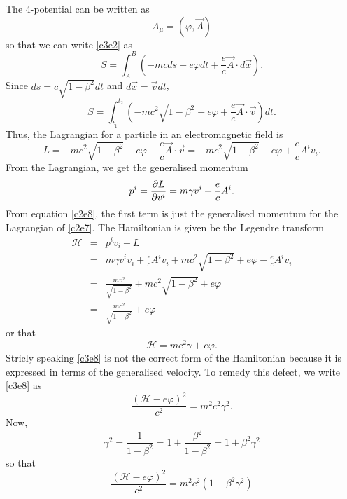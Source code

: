 \begin{enumerate}
The 4-potential can be written as 
\begin{equation}\label{c3e3}
A_\mu = (\varphi, \vec{A})
\end{equation}
so that we can write \eqref{c3e2} as
\begin{equation}\label{c3e4}
S = \int_A^B\left(-mcds - e\varphi dt + 
\frac{e}{c}\vec{A}\cdot d\vec{x}\right).
\end{equation}
Since $ds = c\sqrt{1 - \beta^2}dt$ and $d\vec{x} = \vec{v}dt$,
\begin{equation}\label{c3e5}
S = \int_{t_1}^{t_2}\left(-mc^2\sqrt{1 - \beta^2} - e\varphi + 
\frac{e}{c}\vec{A}\cdot\vec{v}\right)dt.
\end{equation}
Thus, the Lagrangian for a particle in an electromagnetic field is
\begin{equation}\label{c3e6}
L = -mc^2\sqrt{1 - \beta^2} - e\varphi + \frac{e}{c}\vec{A}\cdot\vec{v}
= -mc^2\sqrt{1 - \beta^2} - e\varphi + \frac{e}{c}A^i v_i.
\end{equation}
From the Lagrangian, we get the generalised momentum
\begin{equation}\label{c3e7}
p^i = \frac{\partial{L}}{\partial{v^i}} = m\gamma v^i + \frac{e}{c}A^i.
\end{equation}
From equation \eqref{c2e8}, the first term is just the generalised momentum for
the Lagrangian of \eqref{c2e7}. The Hamiltonian is given be the Legendre
transform
\begin{eqnarray*}
\mathcal{H} &=& p^iv_i - L \\
  &=& m\gamma v^iv_i + \frac{e}{c}A^iv_i + mc^2\sqrt{1 - \beta^2} + e\varphi - 
  \frac{e}{c}A^iv_i \\
  &=& \frac{mv^2}{\sqrt{1 - \beta^2}} + mc^2\sqrt{1 - \beta^2} + e\varphi \\
  &=& \frac{mc^2}{\sqrt{1 - \beta^2}} + e\varphi
\end{eqnarray*}
or that
\begin{equation}\label{c3e8}
\mathcal{H} = mc^2\gamma + e\varphi.
\end{equation}
Stricly speaking \eqref{c3e8} is not the correct form of the Hamiltonian because
it is expressed in terms of the generalised velocity. To remedy this defect, we 
write
\eqref{c3e8} as
\[
\frac{(\mathcal{H} - e\varphi)^2}{c^2} = m^2c^2 \gamma^2.
\]
Now,
\begin{equation}\label{c3e9}
\gamma^2 = \frac{1}{1 - \beta^2} = 1 + \frac{\beta^2}{1 - \beta^2} = 
1 + \beta^2\gamma^2
\end{equation}
so that
\[
\frac{(\mathcal{H} - e\varphi)^2}{c^2} = m^2c^2(1 + \beta^2\gamma^2) 
\]
\end{enumerate}
